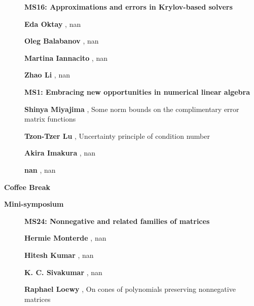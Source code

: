 \documentclass[ILAS2025-program.tex]{subfiles}
\begin{document}
\begin{description}
    \begin{description}
    \item[] {\color{mstitle}\textbf{MS16: Approximations and errors in Krylov-based solvers}} 
    \item[] \textbf{Eda Oktay} , nan
        \item[] \textbf{Oleg Balabanov} , nan
        \item[] \textbf{Martina Iannacito} , nan
        \item[] \textbf{Zhao Li} , nan
        \end{description}
    \begin{description}
    \item[] {\color{mstitle}\textbf{MS1: Embracing new opportunities in numerical linear algebra}} 
    \item[] \textbf{Shinya Miyajima} , Some norm bounds on the complimentary error matrix functions
        \item[] \textbf{Tzon-Tzer Lu} , Uncertainty principle of condition number
        \item[] \textbf{Akira Imakura} , nan
        \item[] \textbf{nan} , nan
        \end{description}
    \item[\info{15:30\textrm{--}16:00}] \textbf{Coffee Break} 
    \item[\info{16:00\textrm{--}18:00}] \textbf{Mini-symposium} 
    \begin{description}
    \item[] {\color{mstitle}\textbf{MS24: Nonnegative and related families of matrices}} 
    \item[] \textbf{Hermie Monterde} , nan
        \item[] \textbf{Hitesh Kumar} , nan
        \item[] \textbf{K. C. Sivakumar} , nan
        \item[] \textbf{Raphael Loewy} , On cones of polynomials preserving nonnegative matrices
        \end{description}
    \begin{description}

\end{description}
\end{description}
\end{document}
